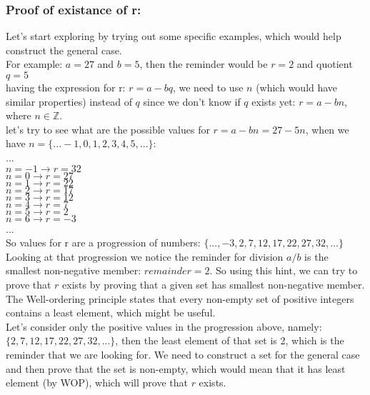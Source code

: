 \documentclass{article}
\begin{document}
\subsubsection*{Proof of existance of r:}
Let's start exploring by trying out some specific examples, which would help construct the general case. \\
For example: $a = 27$ and $b = 5$, then the reminder would be $r = 2$ and quotient $q = 5$\\
having the expression for r: $r = a - bq$, we need to use $n$ (which would have similar properties) instead of $q$ since we don't know if $q$ exists yet: $r = a - bn$, where $n \in \mathbb{Z}$.\\
let's try to see what are the possible values for $r = a - bn = 27 - 5n$, when we have $n = \{... -1, 0, 1, 2, 3, 4, 5, ...\}$:\\
...\\
$n = -1 \rightarrow r = 32$\\
$n = 0 \rightarrow r = 27$\\
$n = 1 \rightarrow r = 22$\\
$n = 2 \rightarrow r = 17$\\
$n = 3 \rightarrow r = 12$\\
$n = 4 \rightarrow r = 7$\\
$n = 5 \rightarrow r = 2$\\
$n = 6 \rightarrow r = -3$\\
...\\
So values for r are a progression of numbers: $\{..., -3, 2, 7, 12, 17, 22, 27, 32, ...\}$\\
Looking at that progression we notice the reminder for division $a/b$ is the smallest non-negative member: $remainder = 2$. So using this hint, we can try to prove that $r$ exists by proving that a given set has smallest non-negative member. The Well-ordering principle states that every non-empty set of positive integers contains a least element, which might be useful.\\
Let's consider only the positive values in the progression above, namely: $\{2,7,12,17,22,27,32,...\}$, then the least element of that set is 2, which is the reminder that we are looking for. We need to construct a set for the general case and then prove that the set is non-empty, which would mean that it has least element (by WOP), which will prove that $r$ exists.
\end{document}
